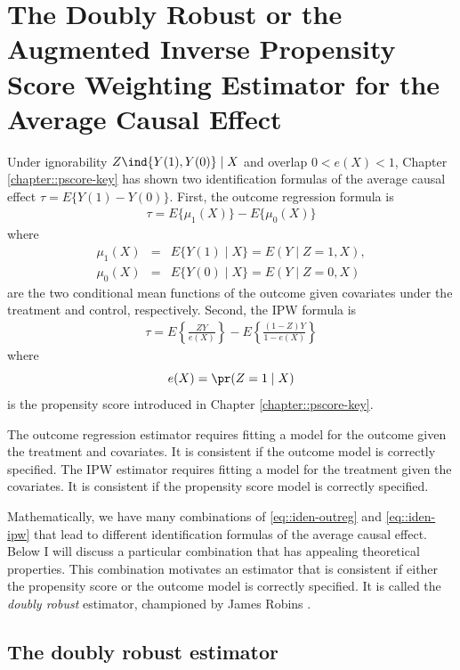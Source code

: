 
\chapter{The Doubly Robust or the Augmented Inverse Propensity Score Weighting Estimator for the Average Causal Effect}\label{chapter::doubly-robust}

Under ignorability $Z\ind \{ Y(1), Y(0) \} \mid X$ and overlap $0< e(X) < 1$, Chapter \ref{chapter::pscore-key} has shown two identification formulas of the average causal effect $\tau = E\{ Y(1) - Y(0)  \}$. First, the outcome regression formula  is 
\begin{eqnarray}
\tau  =  E\{ \mu_1(X) \} - E\{ \mu_0(X) \} \label{eq::iden-outreg}
\end{eqnarray}
where 
\begin{eqnarray*}
\mu_1(X)  &=& E\{  Y(1) \mid X \} = E(Y\mid Z=1, X),\\ 
\mu_0(X) &=& E\{  Y(0) \mid X \} = E(Y\mid Z=0, X)
\end{eqnarray*}
are the two conditional mean functions of the outcome given covariates under the treatment and control, respectively. Second, the IPW formula is 
\begin{eqnarray}
\tau = E\left\{  \frac{ZY}{e(X)}   \right\} - E\left\{  \frac{(1-Z)Y}{1-e(X)}   \right\} \label{eq::iden-ipw}
\end{eqnarray}
where
$$
e(X) = \pr(Z=1\mid X)
$$
is the propensity score introduced in Chapter \ref{chapter::pscore-key}.  


The outcome regression estimator requires fitting a model for the outcome given the treatment and covariates. It is consistent if the outcome model is correctly specified. The IPW estimator requires fitting a model for the treatment given the covariates. It is consistent if the propensity score model is correctly specified. 


Mathematically, we have many combinations of \eqref{eq::iden-outreg} and \eqref{eq::iden-ipw} that lead to different identification formulas of the average causal effect. Below I will discuss a particular combination that has appealing theoretical properties. This combination motivates an estimator that is consistent if either the propensity score or the outcome model is correctly specified. It is called the {\it doubly robust} estimator, championed by James Robins \citep{scharfstein1999adjusting, bang2005doubly}. 



\section{The doubly robust estimator}

